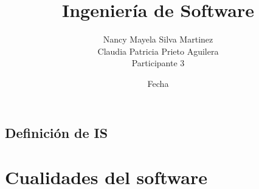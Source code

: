 \documentclass{book}
\title{Ingenier\'ia de Software}
\author{ Nancy Mayela Silva Martinez \\ Claudia Patricia Prieto Aguilera \\ Participante 3 }
\date{Fecha}
\begin{document}
\maketitle


\section{ Definici\'on de IS}
%
%  
\chapter{Cualidades del software}

%

\end{document}
